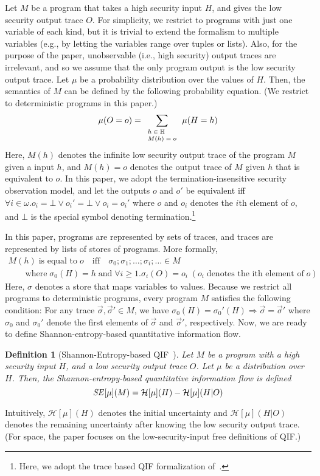 \documentclass[]{eptcs}
\newtheorem{definition}[theorem]{Definition}
\newcommand{\vect}[1]{\overrightarrow{{#1}}}
\begin{document}
Let $M$ be a program that takes a high security input $H$, and gives
the low security output trace $O$.  For simplicity, we restrict to
programs with just one variable of each kind, but it is trivial to
extend the formalism to multiple variables (e.g., by letting the
variables range over tuples or lists).  Also, for the purpose of the
paper, unobservable (i.e., high security) output traces are
irrelevant, and so we assume that the only program output is the low
security output trace.  Let $\mu$ be a probability distribution over
the values of $H$.  Then, the semantics of $M$ can be defined by the
following probability equation.  (We restrict to deterministic
programs in this paper.)
\[
\mu(O = o) = \sum_{\scriptsize \begin{array}{l}h \in \mathbb{H}\\ M(h) = o\end{array}} \mu(H = h)
\]
Here, $M(h)$ denotes the infinite low security output trace of the
program $M$ given a input $h$, and $M(h)=o$ denotes the output trace
of $M$ given $h$ that is equivalent to $o$.  In this paper, we adopt
the termination-insensitive security observation model, and let the
outputs $o$ and $o'$ be equivalent iff $\forall i \in \omega.o_i=\bot
\vee o_i'=\bot \vee o_i=o_i'$ where $o$ and $o_i$ denotes the $i$th
element of $o$, and $\bot$ is the special symbol denoting
termination.\footnote{Here, we adopt the trace based QIF formalization
  of~\cite{malacaria08}.}

In this paper, programs are represented by sets of traces, and traces
are represented by lists of stores of programs.  More formally,
\[
\begin{array}{l}
  M(h)\;\text{is equal to}\;o \quad\text{iff}\quad  \sigma_0;\sigma_1;\ldots;\sigma_i;\ldots \in M\\
  \qquad\text{where}\;\sigma_0(H)=h\;\text{and}\;\forall i\geq 1.\sigma_i(O)=o_i\;(o_i\;\text{denotes the ith element of}\;o)
\end{array}
\]
Here, $\sigma$ denotes a store that maps variables to values.  Because
we restrict all programs to deterministic programs, every program $M$
satisfies the following condition: For any trace
$\vect\sigma,\vect\sigma'\in M$, we have
$\sigma_0(H)=\sigma_0'(H)\Rightarrow \vect\sigma=\vect\sigma'$ where
$\sigma_0$ and $\sigma_0'$ denote the first elements of $\vect\sigma$
and $\vect\sigma'$, respectively.  Now, we are ready to define
Shannon-entropy-based quantitative information
flow.
\begin{definition}[Shannon-Entropy-based
  QIF~\cite{denning82,clarkjcs2007,malacaria:popl2007}]
\label{def:se}
Let $M$ be a program with a high security input $H$, and a low
security output trace $O$.  Let $\mu$ be a distribution over $H$.
Then, the Shannon-entropy-based quantitative information flow is
defined
\[
{\it SE}[\mu](M) =  \mathcal{H}[\mu](H)-\mathcal{H}[\mu](H|O)
\]
\end{definition}
Intuitively, $\mathcal{H}[\mu](H)$ denotes the initial uncertainty and
$\mathcal{H}[\mu](H|O)$ denotes the remaining uncertainty after
knowing the low security output trace.  (For space, the paper focuses
on the low-security-input free definitions of QIF.)  
\end{document}
